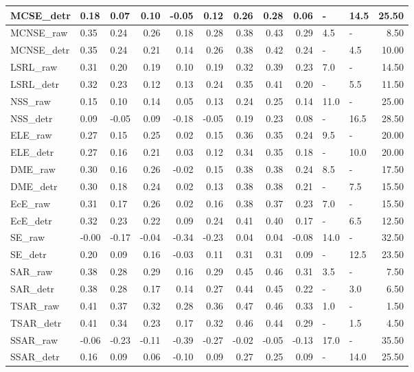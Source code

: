 \begin{tabular}{lllrrrrrrllr}
MCSE\_detr & 0.18 & 0.07 & 0.10 & -0.05 & 0.12 & 0.26 & 0.28 & 0.06 & - & 14.5 & 25.50 \\
\midrule
MCNSE\_raw & 0.35 & 0.24 & 0.26 & 0.18 & 0.28 & 0.38 & 0.43 & 0.29 & 4.5 & - & 8.50 \\
MCNSE\_detr & 0.35 & 0.24 & 0.21 & 0.14 & 0.26 & 0.38 & 0.42 & 0.24 & - & 4.5 & 10.00 \\
\midrule
LSRL\_raw & 0.31 & 0.20 & 0.19 & 0.10 & 0.19 & 0.32 & 0.39 & 0.23 & 7.0 & - & 14.50 \\
LSRL\_detr & 0.32 & 0.23 & 0.12 & 0.13 & 0.24 & 0.35 & 0.41 & 0.20 & - & 5.5 & 11.50 \\
\midrule
NSS\_raw & 0.15 & 0.10 & 0.14 & 0.05 & 0.13 & 0.24 & 0.25 & 0.14 & 11.0 & - & 25.00 \\
NSS\_detr & 0.09 & -0.05 & 0.09 & -0.18 & -0.05 & 0.19 & 0.23 & 0.08 & - & 16.5 & 28.50 \\
\midrule
ELE\_raw & 0.27 & 0.15 & 0.25 & 0.02 & 0.15 & 0.36 & 0.35 & 0.24 & 9.5 & - & 20.00 \\
ELE\_detr & 0.27 & 0.16 & 0.21 & 0.03 & 0.12 & 0.34 & 0.35 & 0.18 & - & 10.0 & 20.00 \\
\midrule
DME\_raw & 0.30 & 0.16 & 0.26 & -0.02 & 0.15 & 0.38 & 0.38 & 0.24 & 8.5 & - & 17.50 \\
DME\_detr & 0.30 & 0.18 & 0.24 & 0.02 & 0.13 & 0.38 & 0.38 & 0.21 & - & 7.5 & 15.50 \\
\midrule
EcE\_raw & 0.31 & 0.17 & 0.26 & 0.02 & 0.16 & 0.38 & 0.37 & 0.23 & 7.0 & - & 15.50 \\
EcE\_detr & 0.32 & 0.23 & 0.22 & 0.09 & 0.24 & 0.41 & 0.40 & 0.17 & - & 6.5 & 12.50 \\
\midrule
SE\_raw & -0.00 & -0.17 & -0.04 & -0.34 & -0.23 & 0.04 & 0.04 & -0.08 & 14.0 & - & 32.50 \\
SE\_detr & 0.20 & 0.09 & 0.16 & -0.03 & 0.11 & 0.31 & 0.31 & 0.09 & - & 12.5 & 23.50 \\
\midrule
SAR\_raw & 0.38 & 0.28 & 0.29 & 0.16 & 0.29 & 0.45 & 0.46 & 0.31 & 3.5 & - & 7.50 \\
SAR\_detr & 0.38 & 0.28 & 0.17 & 0.14 & 0.27 & 0.44 & 0.45 & 0.22 & - & 3.0 & 6.50 \\
\midrule
TSAR\_raw & 0.41 & 0.37 & 0.32 & 0.28 & 0.36 & 0.47 & 0.46 & 0.33 & 1.0 & - & 1.50 \\
TSAR\_detr & 0.41 & 0.34 & 0.23 & 0.17 & 0.32 & 0.46 & 0.44 & 0.29 & - & 1.5 & 4.50 \\
\midrule
SSAR\_raw & -0.06 & -0.23 & -0.11 & -0.39 & -0.27 & -0.02 & -0.05 & -0.13 & 17.0 & - & 35.50 \\
SSAR\_detr & 0.16 & 0.09 & 0.06 & -0.10 & 0.09 & 0.27 & 0.25 & 0.09 & - & 14.0 & 25.50 \\
\midrule
\bottomrule
\end{tabular}
\midrule
